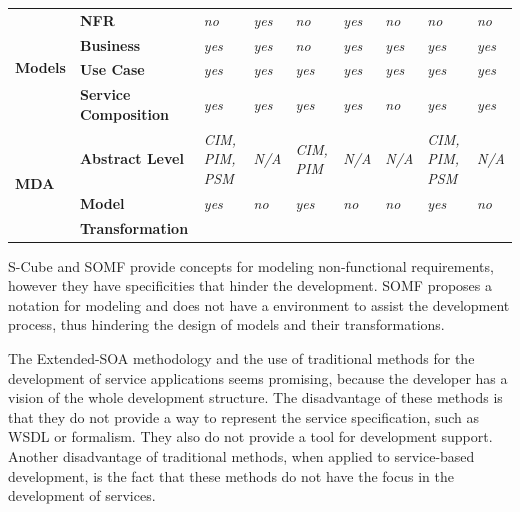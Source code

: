 \begin{table}
\begin{tabular}{l|l|l|l|l|l|l|l|l}
\hline


\multirow{4}{*}{\begin{sideways}\textbf{Models}\end{sideways}} &
\textbf{NFR } & \textit{no} & \textit{yes} &\textit{no}  &\textit{yes}
&\textit{no} & \textit{no} & \textit{no} \\ \cline{2-9}
& \textbf{Business } &\textit{yes} &\textit{yes} & \textit{no}&
\textit{yes}&\textit{yes} &\textit{yes} &\textit{yes}\\\cline{2-9}
 & \textbf{Use Case } &\textit{yes} &\textit{yes} & \textit{yes}& \textit{yes}&
\textit{yes} & \textit{yes}& \textit{yes}\\ \cline{2-9}
& \textbf{Service Composition } & \textit{yes}& \textit{yes}& \textit{yes}&
\textit{yes}& \textit{no}&\textit{yes} &\textit{yes}\\\hline
\multirow{3}{*}{\begin{sideways}\textbf{MDA}\end{sideways}} &
\textbf{Abstract Level} & \textit{CIM, PIM, PSM} &\textit{N/A} &\textit{CIM, PIM} & \textit{N/A}
&\textit{N/A} &\textit{CIM, PIM, PSM} &\textit{N/A} \\ \cline{2-9}

& \textbf{Model}&\textit{yes} & \textit{no}
&\textit{ yes} & \textit{no} & \textit{no} & \textit{yes} & \textit{no}\\

& \textbf{Transformation}& & 
& &  &  & & \\
\hline
\hline
\end{tabular}
\end{table}  

S-Cube and SOMF provide concepts for modeling 
non-functional requirements, however they have specificities that hinder the
development. SOMF proposes a notation for modeling and does not have a
environment to assist the development process, thus hindering the design of
models and their transformations. 


The Extended-SOA methodology and the use of traditional methods for the
development of service applications seems promising, because
the developer has a vision of the whole development structure. The
disadvantage of these methods is that they do not provide a way to represent the service specification, such as WSDL
or formalism. They also do not provide a
tool for development support. Another disadvantage of traditional methods, when
applied to service-based development, is the fact that these methods do not have
the focus in the development of services.

